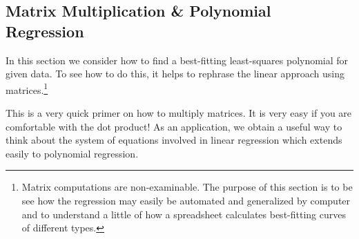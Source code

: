 \clearpage



\subsection{Matrix Multiplication \& Polynomial Regression}

In this section we consider how to find a best-fitting least-squares polynomial for given data. To see how to do this, it helps to rephrase the linear approach using matrices.\footnote{Matrix computations are non-examinable. The purpose of this section is to be see how the regression may easily be automated and generalized by computer and to understand a little of how a spreadsheet calculates best-fitting curves of different types.}
\bigskip

\iffalse
This is a very quick primer on how to multiply matrices. It is very easy if you are comfortable with the dot product! As an application, we obtain a useful way to think about the system of equations involved in linear regression which extends easily to polynomial regression. 
